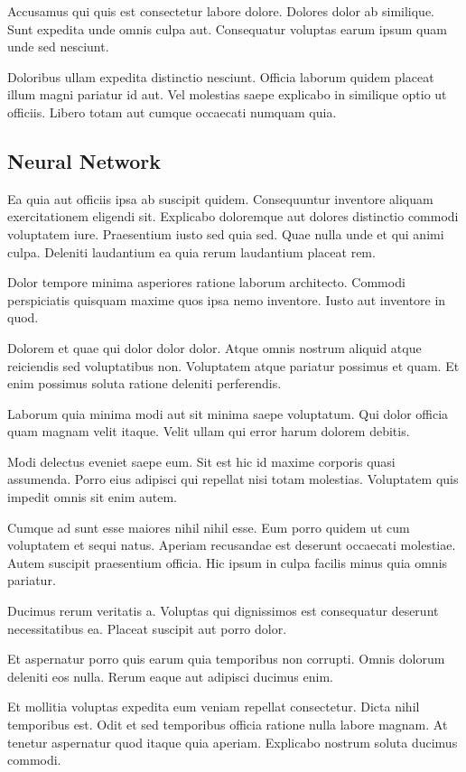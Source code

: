 \documentclass[a4paper]{article}
\begin{document}
\begin{multicols}{2}
Accusamus qui quis est consectetur labore dolore. Dolores dolor ab similique.
    Sunt expedita unde omnis culpa aut. Consequatur voluptas earum ipsum quam
    unde sed nesciunt.

Doloribus ullam expedita distinctio nesciunt. Officia laborum quidem placeat
    illum magni pariatur id aut. Vel molestias saepe explicabo in similique
    optio ut officiis. Libero totam aut cumque occaecati numquam quia.

\subsection{Neural Network}
Ea quia aut officiis ipsa ab suscipit quidem. Consequuntur inventore aliquam
    exercitationem eligendi sit. Explicabo doloremque aut dolores distinctio
    commodi voluptatem iure. Praesentium iusto sed quia sed. Quae nulla unde et
    qui animi culpa. Deleniti laudantium ea quia rerum laudantium placeat rem.

Dolor tempore minima asperiores ratione laborum architecto. Commodi perspiciatis
    quisquam maxime quos ipsa nemo inventore. Iusto aut inventore in quod.

Dolorem et quae qui dolor dolor dolor. Atque omnis nostrum aliquid atque
    reiciendis sed voluptatibus non. Voluptatem atque pariatur possimus et quam.
    Et enim possimus soluta ratione deleniti perferendis.

Laborum quia minima modi aut sit minima saepe voluptatum. Qui dolor officia quam
    magnam velit itaque. Velit ullam qui error harum dolorem debitis.

Modi delectus eveniet saepe eum. Sit est hic id maxime corporis quasi assumenda.
    Porro eius adipisci qui repellat nisi totam molestias. Voluptatem quis
    impedit omnis sit enim autem.

Cumque ad sunt esse maiores nihil nihil esse. Eum porro quidem ut cum voluptatem
    et sequi natus. Aperiam recusandae est deserunt occaecati molestiae. Autem
    suscipit praesentium officia. Hic ipsum in culpa facilis minus quia omnis
    pariatur.

Ducimus rerum veritatis a. Voluptas qui dignissimos est consequatur deserunt
    necessitatibus ea. Placeat suscipit aut porro dolor.

Et aspernatur porro quis earum quia temporibus non corrupti. Omnis dolorum
    deleniti eos nulla. Rerum eaque aut adipisci ducimus enim.

Et mollitia voluptas expedita eum veniam repellat consectetur. Dicta nihil
    temporibus est. Odit et sed temporibus officia ratione nulla labore magnam.
    At tenetur aspernatur quod itaque quia aperiam. Explicabo nostrum soluta
    ducimus commodi.


\end{multicols}
\end{document}
